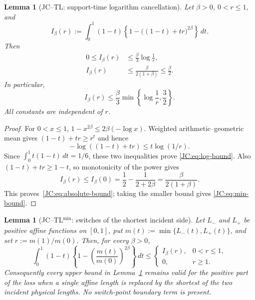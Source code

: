 \documentclass[11pt]{amsart}
\numberwithin{equation}{section}
\newtheorem{lemma}[theorem]{Lemma}
\theoremstyle{definition}
\theoremstyle{remark}
\begin{document}
\begin{lemma}[JC--TL: support-time logarithm cancellation]
\label{JC:lem:support-time-log}
Let $\beta>0$, $0<r\le1$, and
\begin{equation}\label{JC:eq:I-beta}
 I_\beta(r):=\int_0^1(1-t)
 \left\{1-\bigl((1-t)+tr\bigr)^{2\beta}\right\}\,dt.
\end{equation}
Then
\begin{align}
 0\le I_\beta(r)
 &\le\frac\beta3\log\frac1r,\label{JC:eq:log-bound}\\
 I_\beta(r)
 &\le\frac{\beta}{2(1+\beta)}\le\frac\beta2.\label{JC:eq:absolute-bound}
\end{align}
In particular,
\begin{equation}\label{JC:eq:min-bound}
 \boxed{I_\beta(r)\le\frac\beta3
 \min\left\{\log\frac1r,\frac32\right\}.}
\end{equation}
All constants are independent of $r$.
\end{lemma}

\begin{proof}
For $0<x\le1$, $1-x^{2\beta}\le2\beta(-\log x)$.
Weighted arithmetic--geometric mean gives
$(1-t)+tr\ge r^t$ and hence
\[
 -\log((1-t)+tr)\le t\log(1/r).
\]
Since $\int_0^1t(1-t)\,dt=1/6$, these two inequalities prove
\eqref{JC:eq:log-bound}.  Also $(1-t)+tr\ge1-t$, so monotonicity of the
power gives
\[
 I_\beta(r)\le I_\beta(0)
 =\frac12-\frac1{2+2\beta}
 =\frac\beta{2(1+\beta)}.
\]
This proves~\eqref{JC:eq:absolute-bound}; taking the smaller bound gives
\eqref{JC:eq:min-bound}.
\end{proof}

\begin{lemma}[JC--TL$^{\min}$: switches of the shortest incident side]
\label{JC:lem:support-time-min}
Let $L_-$ and $L_+$ be positive affine functions on $[0,1]$, put
$m(t):=\min\{L_-(t),L_+(t)\}$, and set $r:=m(1)/m(0)$.  Then, for every
$\beta>0$,
\begin{equation}\label{JC:eq:min-affine-payment}
 \int_0^1(1-t)\left\{1-
 \left(\frac{m(t)}{m(0)}\right)^{2\beta}\right\}\,dt
 \le
 \begin{cases}
 I_\beta(r),&0<r\le1,\\
 0,&r\ge1.
 \end{cases}
\end{equation}
Consequently every \emph{upper} bound in
Lemma~\ref{JC:lem:support-time-log} remains valid for the positive part of the
loss when a single affine length is replaced by the shortest of the two
incident physical lengths.  No switch-point boundary term is present.
\end{lemma}
\end{document}
